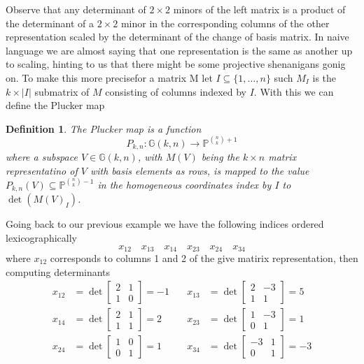 \documentclass[40pt]{article}
\newtheorem{definition}{Definition}[section]
\newcommand{\Proj}{\mathbb{P}}
\newcommand{\G}{\mathbb{G}}
\theoremstyle{remark}
\begin{document}
				Observe that any determinant of $2\times 2$ minors of the left matrix is a product of the determinant of a $2 \times 2$ minor in the corresponding columns of the other representation scaled by the determinant of the change of basis matrix. In naive language we are almost saying that one representation is the same as another up to scaling, hinting to us that there might be some projective shenanigans gonig on. To make this more precisefor a matrix M let $I \subseteq \{1,\dots,n\}$ such $M_I$ is the $k \times |I|$ submatrix of $M$ consisting of columns indexed by $I$. With this we can define the Plucker map
				\begin{definition}
					The Plucker map is a function
					\[
				P_{k,n} : \G(k,n) \to \Proj^{{n \choose k }+ 1}
					\]
					where a subspace $V \in \G(k,n)$, with $M(V)$ being the $k \times n$ matrix representatino of $V$ with basis elements as rows, is mapped to the value $P_{k,n}(V)\subseteq\Proj^{{n\choose k} - 1}$ in the homogeneous coordinates index by $I$ to $\det(M(V)_I)$. 
				\end{definition}
				Going back to our previous example we have the following indices ordered lexicographically
				\[
				x_{12} \quad x_{13} \quad x_{14} \quad x_{23} \quad x_{24} \quad x_{34}
				\]
				where $x_{12}$ corresponds to columns 1 and 2 of the give matirix representation, then computing determinants
				\begin{align*}
					x_{12} &= \det\begin{bmatrix}
						2 & 1 \\
						1 & 0
					\end{bmatrix} = -1 &\quad x_{13} &= \det\begin{bmatrix}
					2 & -3 \\
					1 & 1
					\end{bmatrix}=5 \\
					x_{14} &= \det\begin{bmatrix}
						2 & 1 \\
						1 & 1
					\end{bmatrix}=2 &\quad x_{23}&=\det\begin{bmatrix}
					1 & -3 \\
					0 & 1
					\end{bmatrix} =1 \\
					x_{24}&=\det\begin{bmatrix}
						1 & 0 \\
						0 & 1 
					\end{bmatrix} = 1 &\quad x_{34}&=\det\begin{bmatrix}
					-3 & 1 \\
					0 & 1
					\end{bmatrix} = -3
				\end{align*}
\end{document}
